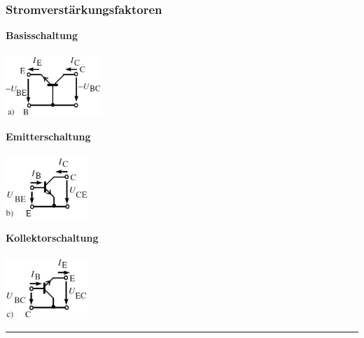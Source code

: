         \subsubsection{Stromverst\"arkungsfaktoren}
            \begin{minipage}[T]{6cm}
                \bf Basisschaltung\\
                \\
                \includegraphics[height=2.3cm]{./bilder/AmpBasisSch.png}
            \end{minipage}
            \begin{minipage}[T]{6cm}
                \bf Emitterschaltung\\
                \\
                \includegraphics[height=2.3cm]{./bilder/AmpEmitSch.png}                
            \end{minipage}
            \begin{minipage}[T]{6cm}
                \bf Kollektorschaltung\\
                \\
                \includegraphics[height=2.3cm]{./bilder/AmpKolSch.png}                
            \end{minipage}
\hrule
